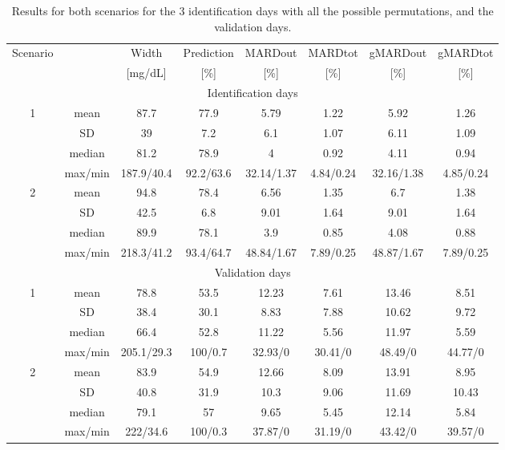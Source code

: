 \begin{sidewaystable}[hbtp]
	\centering
	\begin{tabular}{| c | c | c | c | c | c | c | c |}
	\multicolumn{1}{c}{Scenario} & \multicolumn{1}{c}{} & \multicolumn{1}{c}{Width} & \multicolumn{1}{c}{Prediction} & \multicolumn{1}{c}{MARDout} & \multicolumn{1}{c}{MARDtot} & \multicolumn{1}{c}{gMARDout} & \multicolumn{1}{c}{gMARDtot} \\
	\multicolumn{1}{c}{} & \multicolumn{1}{c}{} & \multicolumn{1}{c}{[mg/dL]} & \multicolumn{1}{c}{[\%]} & \multicolumn{1}{c}{[\%]} & \multicolumn{1}{c}{[\%]} & \multicolumn{1}{c}{[\%]} & \multicolumn{1}{c}{[\%]} \\
	\hline
	\multicolumn{8}{c}{Identification days}\\
	\hline
	\multirow{4}{*}{1} & mean & 87.7 & 77.9 & 5.79 & 1.22 & 5.92 & 1.26 \\
	\cline{2-8}
  & SD & 39 & 7.2 & 6.1 & 1.07 & 6.11 & 1.09 \\
	\cline{2-8} 
	& median & 81.2 & 78.9 & 4 & 0.92 & 4.11 & 0.94 \\
	\cline{2-8} 
	& max/min & 187.9/40.4 & 92.2/63.6 & 32.14/1.37 & 4.84/0.24 & 32.16/1.38 & 4.85/0.24 \\
	\hline 
	\multirow{4}{*}{2} & mean & 94.8 & 78.4 & 6.56 & 1.35 & 6.7 & 1.38 \\
	\cline{2-8} 
  & SD & 42.5 & 6.8 & 9.01 & 1.64 & 9.01 & 1.64 \\
	\cline{2-8} 
	& median & 89.9 & 78.1 & 3.9 & 0.85 & 4.08 & 0.88 \\
	\cline{2-8} 
	& max/min & 218.3/41.2 & 93.4/64.7 & 48.84/1.67 & 7.89/0.25 & 48.87/1.67 & 7.89/0.25 \\
	\hline
	\multicolumn{8}{c}{Validation days}\\
	\hline
	\multirow{4}{*}{1} & mean & 78.8 & 53.5 & 12.23 & 7.61 & 13.46 & 8.51 \\
	\cline{2-8}
  & SD & 38.4 & 30.1 & 8.83 & 7.88 & 10.62 & 9.72 \\
	\cline{2-8}
	& median & 66.4 & 52.8 & 11.22 & 5.56 & 11.97 & 5.59 \\
	\cline{2-8}
	& max/min & 205.1/29.3 & 100/0.7 & 32.93/0 & 30.41/0 & 48.49/0 & 44.77/0 \\
	\hline 
	\multirow{4}{*}{2} & mean & 83.9 & 54.9 & 12.66 & 8.09 & 13.91 & 8.95 \\
	\cline{2-8} 
  & SD & 40.8 & 31.9 & 10.3 & 9.06 & 11.69 & 10.43 \\
	\cline{2-8} 
	& median & 79.1 & 57 & 9.65 & 5.45 & 12.14 & 5.84 \\
	\cline{2-8} 
	& max/min & 222/34.6 & 100/0.3 & 37.87/0 & 31.19/0 & 43.42/0 & 39.57/0 \\
  \hline 
	\end{tabular}
\caption{Results for both scenarios for the 3 identification days with all the possible permutations, and the validation days.}
\label{tab:results2scenarios}
\end{sidewaystable}

